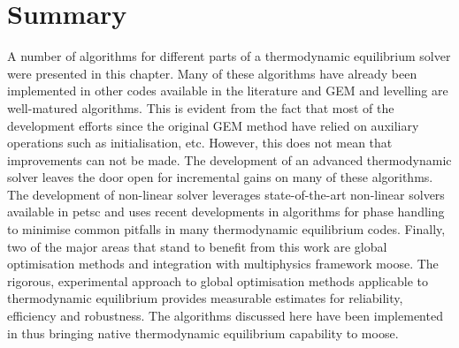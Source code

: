 \section{Summary}
	A number of algorithms for different parts of a thermodynamic equilibrium solver were presented in this chapter. Many of these algorithms have already been implemented in other codes available in the literature and GEM and levelling are well-matured algorithms. This is evident from the fact that most of the development efforts since the original GEM method have relied on auxiliary operations such as initialisation, etc. However, this does not mean that improvements can not be made.  The development of an advanced thermodynamic solver leaves the door open for incremental gains on many of these algorithms. The development of non-linear solver leverages state-of-the-art non-linear solvers available in \gls{petsc} and uses recent developments in algorithms for phase handling to minimise common pitfalls in many thermodynamic equilibrium codes. Finally, two of the major areas that stand to benefit from this work are global optimisation methods and integration with multiphysics framework {\gls{moose}}. The rigorous, experimental approach to global optimisation methods applicable to thermodynamic equilibrium provides measurable estimates for reliability, efficiency and robustness. The algorithms discussed here have been implemented in {\GEM} thus bringing native thermodynamic equilibrium capability to \gls{moose}.
